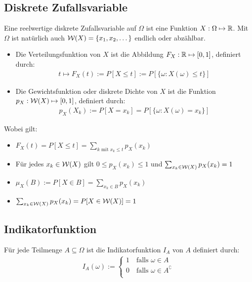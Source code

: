 \subsection*{Diskrete Zufallsvariable}
Eine reelwertige diskrete Zufallsvariable auf $\Omega$ ist eine Funktion $X :
  \Omega \mapsto \mathbb{R}$. Mit $\Omega$ ist natürlich auch $\mathcal{W} (X) = \{x_1, x_2,
  \dots\}$ endlich oder abzählbar.
\begin{itemize}
  \item Die Verteilungsfunktion von $X$ ist die Abbildung $F_X : \mathbb{R} \mapsto [0, 1]$,
        definiert durch:
        \begin{align*}
          t \mapsto F_X (t) := P[X \leq t] := P[\{\omega : X (\omega) \leq t\}]
        \end{align*}
  \item Die Gewichtsfunktion oder diskrete Dichte von $X$ ist die Funktion $p_X : \mathcal{W}
          (X) \mapsto [0, 1]$, definiert durch:
        \begin{align*}
          p_X (X_k) := P[X = x_k] = P[\{\omega : X (\omega) = x_k\}]
        \end{align*}
\end{itemize}
Wobei gilt:
\begin{itemize}
  \item $F_X (t) = P[X \leq t] = \sum_{k \text{ mit } x_k \leq t} p_X (x_k)$
  \item Für jedes $x_k \in \mathcal{W} (X)$ gilt $0 \leq p_X (x_k) \leq 1$ und $\sum_{x_k \in \mathcal{W}
            (X)} p_X (x_k) = 1$
  \item $\mu_X (B) := P[X \in B] = \sum_{x_k \in B} p_X (x_k)$
  \item $\sum_{x_k \in \mathcal{W} (X)} p_X (x_k) = P[X \in \mathcal{W} (X)] = 1$
\end{itemize}
\subsection*{Indikatorfunktion}
Für jede Teilmenge $A \subseteq \Omega$ ist die Indikatorfunktion $I_A$ von $A$
definiert durch:
\begin{align*}
  I_A (\omega) :=
  \begin{cases}
    1 \quad \text{falls } \omega \in A             \\
    0 \quad \text{falls } \omega \in A^\complement \\
  \end{cases}
\end{align*}

